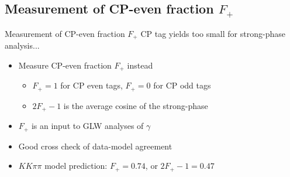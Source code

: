 \documentclass{beamer}
\begin{document}
\subsection{Measurement of CP-even fraction \texorpdfstring{$F_+$}{F+}}

\begin{frame}{Measurement of CP-even fraction $F_+$}
  CP tag yields too small for strong-phase analysis...
  \begin{itemize}
    \setlength\itemsep{0.5em}
    \item{Measure CP-even fraction $F_+$ instead}
    \begin{itemize}
      \setlength\itemsep{0.5em}
      \item{$F_+ = 1$ for CP even tags, $F_+ = 0$ for CP odd tags}
      \item{$2F_+ - 1$ is the average cosine of the strong-phase}
    \end{itemize}
    \item{$F_+$ is an input to GLW analyses of $\gamma$}
    \item{Good cross check of data-model agreement}
    \item{$KK\pi\pi$ model prediction: $F_+ = 0.74$, or $2F_+ - 1 = 0.47$}
  \end{itemize}
\end{frame}
\end{document}
